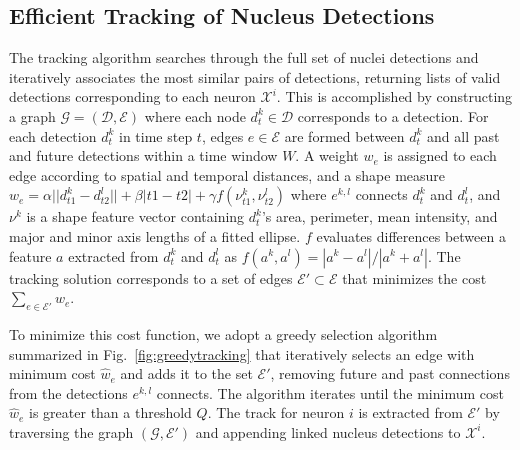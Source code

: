 \vspace{-3mm}
\subsection{Efficient Tracking of Nucleus Detections}
\label{sec:tracking}
\vspace{-2mm}

The tracking  algorithm searches through the  full set of  nuclei detections and
iteratively associates the most similar  pairs of detections, returning lists of
valid  detections  corresponding  to   each  neuron  $\mathcal{X}^i$.   This  is
accomplished  by  constructing  a graph  $\mathcal{G}=(\mathcal{D},\mathcal{E})$
where each  node $d^k_t \in \mathcal{D}$  corresponds to a  detection.  For each
detection $d^k_t$ in time step $t$, edges $e \in \mathcal{E}$ are formed between
$d^k_t$ and all  past and future detections within a time  window $W$.  A weight
$w_e$ is assigned to each edge  according to spatial and temporal distances, and
a shape measure  $w_{e} = \alpha || d^k_{t1}  - d^l_{t2} || + \beta |t1  - t2| +
\gamma f(\nu^k_{t1}, \nu^l_{t2})$ where  $e^{k,l}$ connects $d^k_t$ and $d^l_t$,
and $\nu^k$ is a shape feature vector containing $d^k_t$'s area, perimeter, mean
intensity, and major  and minor axis lengths of a  fitted ellipse. $f$ evaluates
differences  between  a  feature  $a$  extracted from  $d^k_t$  and  $d^l_t$  as
$f(a^k,a^l)  =  {|a^k  -   a^l|}/{|a^k  +  a^l|}$.   The  tracking  solution
corresponds to a set of  edges $\mathcal{E'} \subset \mathcal{E}$ that minimizes
the cost $\sum_{e \in \mathcal{E'}} w_e$.

To minimize this  cost function, we adopt a  greedy selection algorithm 
summarized in Fig.~\ref{fig:greedytracking} that
iteratively selects an edge with minimum cost  $\hat w_e$ and adds it to the set
$\mathcal{E}'$,  removing  future  and  past  connections  from  the  detections
$e^{k,l}$ connects. The algorithm iterates  until the minimum cost $\hat w_e$ is
greater  than a  threshold  $Q$. The  track  for neuron  $i$  is extracted  from
$\mathcal{E}'$   by  traversing   the  graph   $(\mathcal{G},\mathcal{E}')$  and
appending linked nucleus detections to $\mathcal{X}^i$.


